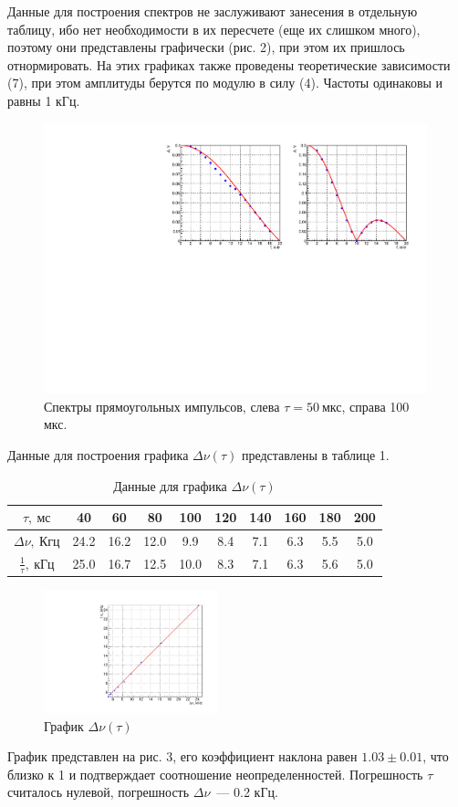 \documentclass[12pt,a4paper]{article}
\begin{document}
Данные для построения спектров не заслуживают занесения в отдельную таблицу, ибо нет необходимости в их пересчете (еще их слишком много), поэтому они представлены графически (рис. 2), при этом их пришлось отнормировать. На этих графиках также проведены теоретические зависимости (7), при этом амплитуды берутся по модулю в силу (4). Частоты одинаковы и равны 1 кГц.
\begin{figure}[h!]
\centering\includegraphics[width = 0.99\textwidth]{Plot1}
\captionsetup{justification = centering}
\caption{Спектры прямоугольных импульсов, слева $\tau = 50~\text{мкс}$, справа 100 мкс. \label{Pct1}}
\end{figure}
Данные для построения графика $\Delta \nu(\tau)$ представлены в таблице 1.
\newpage
\begin{table}\centering
\begin{tabular}[ht]{|*{10}{c|}}
\hline
$\tau,~\text{мс}$&40&60&80&100&120&140&160&180&200\\
\hline
$\Delta \nu,~\text{Кгц}$&24.2&16.2&12.0&9.9&8.4&7.1&6.3&5.5&5.0\\
\hline
$\frac{1}{\tau},~\text{кГц}$&25.0&16.7&12.5&10.0&8.3&7.1&6.3&5.6&5.0\\
\hline
\end{tabular}
\caption{Данные для графика $\Delta \nu(\tau)$}
\end{table}
\begin{figure}
\centering\includegraphics[width = 0.45\textwidth]{Plot2}
\captionsetup{justification = centering}
\caption{График $\Delta \nu(\tau)$ \label{Plot2}}
\vspace{-60pt}
\end{figure}
График представлен на рис. 3, его коэффициент наклона равен $1.03\pm0.01$, что близко к 1 и подтверждает соотношение неопределенностей. Погрешность $\tau$ считалось нулевой, погрешность $\Delta \nu$~--- 0.2 кГц.
\end{document}
